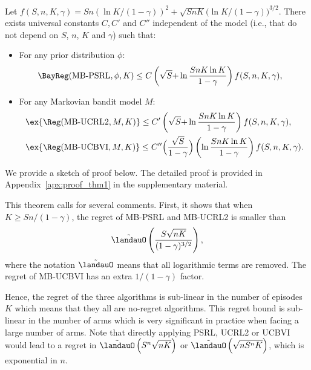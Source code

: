 \begin{thm}
    \label{thm:regret_upper_bound}
    Let $f(S,n,K,\gamma)=Sn\left(\ln K/(1{-}\gamma)\right)^{2}{+} \sqrt{SnK}\bigl(\ln K/(1{-}\gamma)\bigr)^{3/2}$. There exists universal constants $C, C'$ and $C''$ independent of the model (i.e., that do not depend on $S$, $n$, $K$ and $\gamma$) such that:
    \begin{itemize}
        \item For any prior distribution $\phi$:
        \begin{align*}
            \BayReg(\textnormal{MB-PSRL},\phi,K) &\le C\left(\sqrt{S} {+}\ln\frac{SnK\ln K}{1-\gamma}\right) f(S,n,K,\gamma),
        \end{align*}
        \item For any Markovian bandit model $M$:
    \begin{align*}
        &\ex{\Reg(\textnormal{MB-UCRL2},M,K)} \le C'\left(\sqrt{S} {+}\ln\frac{SnK\ln K}{1-\gamma}\right) f(S,n,K,\gamma),\\
        &\ex{\Reg(\textnormal{MB-UCBVI},M,K)} \le C''\Bigl(\frac{\sqrt{S}}{1-\gamma}\Bigr)\left(\ln\frac{SnK\ln K}{1-\gamma}\right) f(S,n,K,\gamma).
    \end{align*}
    \end{itemize}
\end{thm}

We provide a sketch of proof below. The detailed proof is provided in Appendix~\ref{apx:proof_thm1} in the supplementary material.

This theorem calls for several comments. First, it shows that when $K\ge Sn/(1-\gamma)$, the regret of MB-PSRL and MB-UCRL2 is smaller than 
\begin{equation}
    \label{eq:regret_tilde}
    \tilde{\landauO}\left(\frac{S\sqrt{nK}}{(1-\gamma)^{3/2}}\right),
\end{equation}
where the notation $\tilde{\landauO}$ means that all logarithmic terms are removed. The regret of MB-UCBVI has an extra $1/(1-\gamma)$ factor. 

Hence, the regret of the three algorithms is sub-linear in the number of episodes $K$ which means that they all  are no-regret algorithms. This regret bound is sub-linear in the number of arms which is very significant in practice when facing a large number of arms. Note that directly applying PSRL, UCRL2 or UCBVI would lead to a regret in   $\tilde{\landauO}\left(S^n\sqrt{nK}\right)$ or $\tilde{\landauO}\left(\sqrt{nS^nK}\right)$, which is exponential in $n$.


